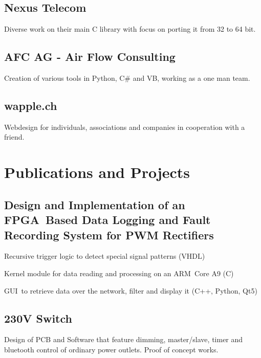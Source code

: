 \documentclass[]{resume}
\begin{document}
\begin{timeline}
\subsection{Nexus Telecom}
Diverse work on their main C library with focus on porting it from 32 to 64 bit.
\sectionsep

\subsection{AFC AG - Air Flow Consulting}
Creation of various tools in Python, C\# and VB, working as a one man team.
\sectionsep

\subsection{wapple.ch}
Webdesign for individuals, associations and companies in cooperation with a friend.
\sectionsep


\section{Publications and Projects}

\subsection{Design and Implementation of an FPGA Based Data Logging and Fault Recording System for PWM Rectifiers}
\vspace{\topsep} %
\begin{tightemize}
\item Recursive trigger logic to detect special signal patterns (VHDL)
\item Kernel module for data reading and processing on an ARM Core A9 (C)
\item GUI to retrieve data over the network, filter and display it (C++, Python, Qt5)
\end{tightemize}
\sectionsep

\subsection{230V Switch}
Design of PCB and Software that feature dimming, master/slave, timer and bluetooth control of ordinary power outlets. Proof of concept works.
\sectionsep


\end{timeline}
\end{document}
